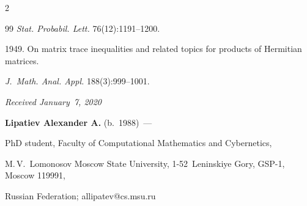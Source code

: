 \begin{multicols}{2}
{{\begin{thebibliography}{99}
\textit{Stat. Probabil. Lett.} 76(12):1191--1200.




 1949. On matrix trace inequalities and related topics for products of Hermitian matrices. 


\textit{J.~Math. Anal. Appl.} 188(3):999--1001.


 \end{thebibliography}





 }


 }





\end{multicols}





\vspace*{-3pt}





  \hfill{\small\textit{Received January~7, 2020}}


















\Contrl





\noindent


\textbf{Lipatiev Alexander A.} (b.\ 1988)~--- 


PhD student,  Faculty of Computational Mathematics and Cybernetics,


 M.\,V.~Lomonosov Moscow State University, 1-52~Leninskiye Gory, GSP-1, Moscow 119991, 


 Russian Federation; \mbox{allipatev@cs.msu.ru}








\label{end\stat}





\renewcommand{\bibname}{\protect\rm Литература}



